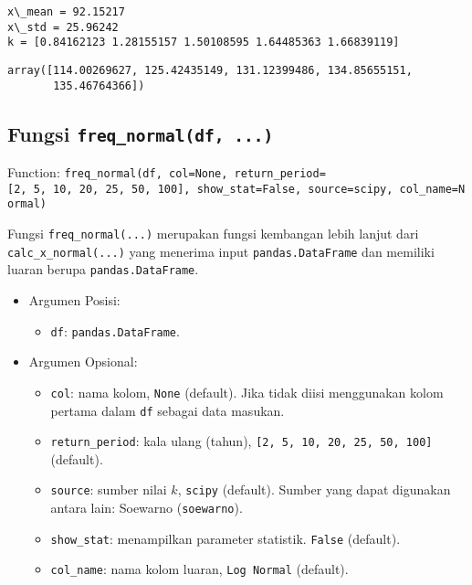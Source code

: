 \documentclass[11pt]{article}
\makeatletter
\providecommand{\tightlist}{%
      \setlength{\itemsep}{0pt}\setlength{\parskip}{0pt}}
\newcommand{\boxspacing}{\kern\kvtcb@left@rule\kern\kvtcb@boxsep}
\newcommand{\prompt}[4]{
        {\ttfamily\llap{{\color{#2}[#3]:\hspace{3pt}#4}}\vspace{-\baselineskip}}
    }
\makeatother
\begin{document}
    \begin{Verbatim}[commandchars=\\\{\}]
x\_mean = 92.15217
x\_std = 25.96242
k = [0.84162123 1.28155157 1.50108595 1.64485363 1.66839119]
    \end{Verbatim}

            \begin{tcolorbox}[breakable, size=fbox, boxrule=.5pt, pad at break*=1mm, opacityfill=0]
\prompt{Out}{outcolor}{ }{\boxspacing}
\begin{Verbatim}[commandchars=\\\{\}]
array([114.00269627, 125.42435149, 131.12399486, 134.85655151,
       135.46764366])
\end{Verbatim}
\end{tcolorbox}
        
    \hypertarget{fungsi-freq_normaldf-...}{%
\subsection{\texorpdfstring{Fungsi
\texttt{freq\_normal(df,\ ...)}}{Fungsi freq\_normal(df, ...)}}\label{fungsi-freq_normaldf-...}}

Function:
\texttt{freq\_normal(df,\ col=None,\ return\_period={[}2,\ 5,\ 10,\ 20,\ 25,\ 50,\ 100{]},\ show\_stat=False,\ source=\textquotesingle{}scipy\textquotesingle{},\ col\_name=\textquotesingle{}Normal\textquotesingle{})}

Fungsi \texttt{freq\_normal(...)} merupakan fungsi kembangan lebih
lanjut dari \texttt{calc\_x\_normal(...)} yang menerima input
\texttt{pandas.DataFrame} dan memiliki luaran berupa
\texttt{pandas.DataFrame}.

\begin{itemize}
\tightlist
\item
  Argumen Posisi:

  \begin{itemize}
  \tightlist
  \item
    \texttt{df}: \texttt{pandas.DataFrame}.
  \end{itemize}
\item
  Argumen Opsional:

  \begin{itemize}
  \tightlist
  \item
    \texttt{col}: nama kolom, \texttt{None} (default). Jika tidak diisi
    menggunakan kolom pertama dalam \texttt{df} sebagai data masukan.
  \item
    \texttt{return\_period}: kala ulang (tahun),
    \texttt{{[}2,\ 5,\ 10,\ 20,\ 25,\ 50,\ 100{]}} (default).
  \item
    \texttt{source}: sumber nilai \(k\),
    \texttt{\textquotesingle{}scipy\textquotesingle{}} (default). Sumber
    yang dapat digunakan antara lain: Soewarno
    (\texttt{\textquotesingle{}soewarno\textquotesingle{}}).
  \item
    \texttt{show\_stat}: menampilkan parameter statistik. \texttt{False}
    (default).
  \item
    \texttt{col\_name}: nama kolom luaran, \texttt{Log\ Normal}
    (default).
  \end{itemize}
\end{itemize}
\end{document}
